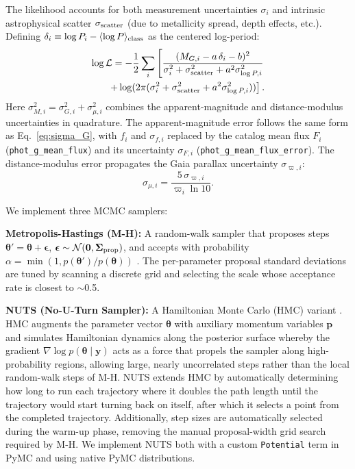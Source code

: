 \documentclass[10pt,preprint2]{aastex}
\begin{document}
The likelihood accounts for both measurement uncertainties $\sigma_i$ and intrinsic astrophysical scatter $\sigma_{\rm scatter}$ (due to metallicity spread, depth effects, etc.). Defining $\delta_i \equiv \log P_i - \langle\log P\rangle_{\rm class}$ as the centered log-period:
\begin{equation}
  \begin{split}
    \log\mathcal{L} = -\frac{1}{2} \sum_i \left[
      \frac{(M_{G,i} - a\,\delta_i - b)^2}{\sigma_i^2 + \sigma_{\rm scatter}^2 + a^2\sigma_{\log P,i}^2} \right. \\
      \left. + \log(2\pi(\sigma_i^2 + \sigma_{\rm scatter}^2 + a^2\sigma_{\log P,i}^2)) \right].
  \end{split}
\end{equation}
Here $\sigma_{M,i}^2 = \sigma_{G,i}^2 + \sigma_{\mu,i}^2$ combines the apparent-magnitude and distance-modulus uncertainties in quadrature. The apparent-magnitude error follows the same form as Eq.~\eqref{eq:sigma_G}, with $f_i$ and $\sigma_{f,i}$ replaced by the catalog mean flux $F_i$ (\texttt{phot\_g\_mean\_flux}) and its uncertainty $\sigma_{F,i}$ (\texttt{phot\_g\_mean\_flux\_error}). The distance-modulus error propagates the Gaia parallax uncertainty $\sigma_{\varpi,i}$:
\begin{equation}
  \sigma_{\mu,i} = \frac{5\,\sigma_{\varpi,i}}{\varpi_i \ln 10}.
\end{equation}

We implement three MCMC samplers:

\textbf{Metropolis-Hastings (M-H):} A random-walk sampler that proposes steps $\boldsymbol{\theta}' = \boldsymbol{\theta} + \boldsymbol{\epsilon}$, $\boldsymbol{\epsilon} \sim \mathcal{N}(\mathbf{0}, \boldsymbol{\Sigma}_{\rm prop})$, and accepts with probability $\alpha = \min(1, p(\boldsymbol{\theta}')/p(\boldsymbol{\theta}))$ \citep{Metropolis1953, Hastings1970}. The per-parameter proposal standard deviations are tuned by scanning a discrete grid and selecting the scale whose acceptance rate is closest to $\sim$0.5.

\textbf{NUTS (No-U-Turn Sampler):} A Hamiltonian Monte Carlo (HMC) variant \citep{HoffmanGelman2014}. HMC augments the parameter vector $\boldsymbol{\theta}$ with auxiliary momentum variables $\mathbf{p}$ and simulates Hamiltonian dynamics along the posterior surface whereby the gradient $\nabla\log p(\boldsymbol{\theta}\mid\mathbf{y})$ acts as a force that propels the sampler along high-probability regions, allowing large, nearly uncorrelated steps rather than the local random-walk steps of M-H. NUTS extends HMC by automatically determining how long to run each trajectory where it doubles the path length until the trajectory would start turning back on itself, after which it selects a point from the completed trajectory. Additionally, step sizes are automatically selected during the warm-up phase, removing the manual proposal-width grid search required by M-H. We implement NUTS both with a custom \texttt{Potential} term in PyMC and using native PyMC distributions.
\end{document}
